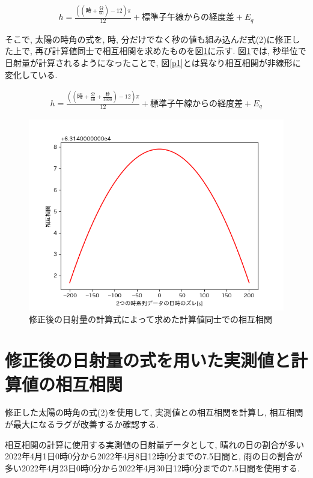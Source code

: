 \documentclass[a4j,12pt,]{jarticle}
\begin{document}
\begin{eqnarray}
  h = \frac{((時 + \frac{分}{60})-12)\pi}{12}+標準子午線からの経度差+E_q
\end{eqnarray}

そこで, 太陽の時角の式を, 時, 分だけでなく秒の値も組み込んだ式(2)に修正した上で, 再び計算値同士で相互相関を求めたものを図\ref{p2}に示す.
図\ref{p2}では, 秒単位で日射量が計算されるようになったことで, 図\ref{p1}とは異なり相互相関が非線形に変化している.

\begin{eqnarray}
  h = \frac{((時 + \frac{分}{60} + \frac{秒}{3600})-12)\pi}{12}+標準子午線からの経度差+E_q
\end{eqnarray}

\begin{figure}[H]
  \begin{center}
    \includegraphics[width=160mm]{2.png}
    \caption{修正後の日射量の計算式によって求めた計算値同士での相互相関}
    \label{p2}
  \end{center}
\end{figure}

\section{修正後の日射量の式を用いた実測値と計算値の相互相関}
修正した太陽の時角の式(2)を使用して, 実測値との相互相関を計算し, 相互相関が最大になるラグが改善するか確認する.

相互相関の計算に使用する実測値の日射量データとして, 晴れの日の割合が多い2022年4月1日0時0分から2022年4月8日12時0分までの7.5日間と, 雨の日の割合が多い2022年4月23日0時0分から2022年4月30日12時0分までの7.5日間を使用する.
\end{document}

